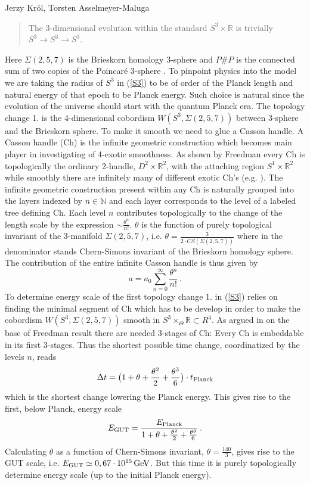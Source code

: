 \begin{artengenv2auth}{Jerzy Kr\'ol, Torsten Asselmeyer-Maluga}
\begin{quotation}
The 3-dimensional evolution within the standard $S^3\times \mathbb{R}$ is trivially $S^3\to S^3\to S^3$.
\end{quotation}
Here $\Sigma(2,5,7)$ is the Brieskorn homology 3-sphere and $P\# P$ is the connected sum of two copies of the Poincar{\'e} 3-sphere \parencite{AK2018,AK2019}. To pinpoint physics into the model we are taking the radius of $S^3$ in (\ref{S3}) to be of order of the Planck length and natural energy of that epoch to be Planck energy. Such choice is natural since the evolution of the universe should start with the quantum Planck era. The topology change 1. is the 4-dimensional cobordism $W(S^3,\Sigma(2,5,7))$ between 3-sphere and the Brieskorn sphere. To make it smooth we need to glue a Casson handle. A Casson handle (Ch) is the infinite geometric construction which becomes main player in investigating of 4-exotic smoothness. As shown by Freedman every Ch is topologically the ordinary 2-handle, $D^2\times \mathbb{R}^2$, with the attaching region $S^1\times \mathbb{R}^2$ while smoothly there are infinitely many of different exotic Ch's (e.g. \cite{GS1999}). The infinite geometric construction present within any Ch is naturally grouped into the layers indexed by $n\in \mathbb{N}$ and each layer corresponds to the level of a labeled tree defining Ch. Each level $n$ contributes topologically to the change of the length scale by the expression $\sim \frac{\theta^n}{n!}$. $\theta$ is the function of purely topological invariant of the 3-manifold $\Sigma(2,5,7)$, i.e. $\theta =\frac{3}{2\cdot CS(\Sigma(2,5,7))}$ where in the denominator stands Chern-Simons invariant of the Brieskorn homology sphere. The contribution of the entire infinite Casson handle is thus given by \parencite{AK2018,AK2014,AK2019}
\begin{equation}\label{exp1} a=a_0\sum_{n=0}^{\infty}\frac{\theta^n}{n!}\,. \end{equation}
To determine energy scale of the first topology change 1. in (\ref{S3}) relies on finding the minimal segment of Ch which has to be develop in order to make the cobordism $W(S^3,\Sigma(2,5,7))$ smooth in $S^3\times_{\Theta}\mathbb{R}\subset R^4$. As argued in \parencite{AK2014,AK2019} on the base of Freedman result there are needed 3-stages of Ch: Every Ch is embeddable in its first 3-stages. Thus the shortest possible time change, coordinatized by the levels $n$, reads \parencite{AK2014,AK2019} 
\[ \Delta t= \big(1+ \theta + \frac{\theta^2}{2}+\frac{\theta^3}{6}\big)\cdot t_{\rm Planck} \]
which is the shortest change lowering the Planck energy. This gives rise to the first, below Planck, energy scale
\[E_{\rm GUT}= \frac{E_{\rm Planck}}{1+ \theta + \frac{\theta^2}{2}+\frac{\theta^3}{6}}\,. \] 
Calculating $\theta$ as a function of Chern-Simons invariant, $\theta=\frac{140}{3}$, gives rise to the GUT scale, i.e. $E_{\rm GUT}\simeq 0,67\cdot 10^{15}\, {\rm GeV}$. But this time it is purely topologically determine energy scale (up to the initial Planck energy). 


\end{artengenv2auth}
